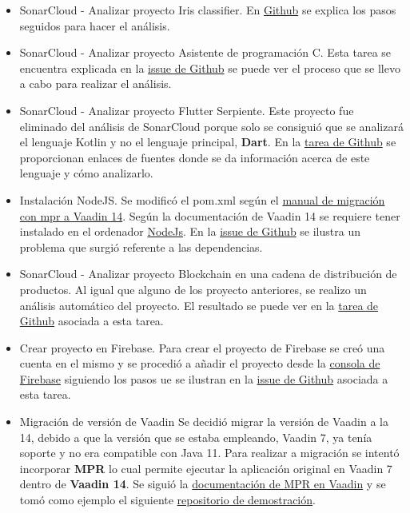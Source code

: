\begin{itemize}
	\item SonarCloud - Analizar proyecto Iris classifier.
		En \href{https://github.com/dbo1001/Gestor-TFG-2021/issues/92}{Github} se explica los pasos seguidos para hacer el análisis.
	\item SonarCloud - Analizar proyecto Asistente de programación C.
		Esta tarea se encuentra explicada en la \href{https://github.com/dbo1001/Gestor-TFG-2021/issues/88}{issue de Github} se puede ver el proceso que se llevo a cabo para realizar el análisis.
	\item SonarCloud - Analizar proyecto Flutter Serpiente.
		Este proyecto fue eliminado del análisis de SonarCloud porque solo se consiguió que se analizará el lenguaje Kotlin y no el lenguaje principal, \textbf{Dart}. En la \href{https://github.com/dbo1001/Gestor-TFG-2021/issues/89}{tarea de Github} se proporcionan enlaces de fuentes donde se da información acerca de este lenguaje y cómo analizarlo. 
	\item Instalación NodeJS.
		Se modificó el pom.xml según el \href{https://vaadin.com/docs/v10/mpr/introduction/step-1-migration-guide}{manual de migración con mpr a Vaadin 14}. Según la documentación de Vaadin 14 se requiere tener instalado en el ordenador \href{https://nodejs.org/en/download/}{NodeJs}. En la \href{https://github.com/dbo1001/Gestor-TFG-2021/issues/97}{issue de Github} se ilustra un problema que surgió referente a las dependencias. 
	\item SonarCloud - Analizar proyecto Blockchain en una cadena de distribución de productos.
		Al igual que alguno de los proyecto anteriores, se realizo un análisis automático del proyecto. El resultado se puede ver en la \href{https://github.com/dbo1001/Gestor-TFG-2021/issues/87}{tarea de Github} asociada a esta tarea.
	\item Crear proyecto en Firebase.
		Para crear el proyecto de Firebase se creó una cuenta en el mismo y se procedió a añadir el proyecto desde la \href{https://console.firebase.google.com/?pli=1}{consola de Firebase} siguiendo los pasos ue se ilustran en la \href{https://github.com/dbo1001/Gestor-TFG-2021/issues/98}{issue de Github} asociada a esta tarea.
	\item Migración de versión de Vaadin
		Se decidió migrar la versión de Vaadin a la 14, debido a que la versión que se estaba empleando, Vaadin 7, ya tenía soporte y no era compatible con Java 11. Para realizar a migración se intentó incorporar \textbf{MPR} lo cual permite ejecutar la aplicación original en Vaadin 7 dentro de \textbf{Vaadin 14}. Se siguió la \href{https://vaadin.com/docs/v14/tools/mpr/introduction/step-1-maven-v7}{documentación de MPR en Vaadin} y se tomó como ejemplo el siguiente \href{https://github.com/OlliTietavainenVaadin/mpr-demo/tree/v7}{repositorio de demostración}.

\end{itemize}
